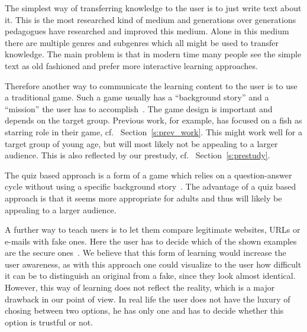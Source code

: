 \begin{description}[leftmargin=0cm]
    \item[Simple Text] The simplest way of transferring knowledge to the user is to just write text about it.
    This is the most researched kind of medium and generations over generations pedagogues have researched and improved this medium.
    Alone in this medium there are multiple genres and subgenres which all might be used to transfer knowledge.
    The main problem is that in modern time many people see the simple text as old fashioned and prefer more interactive learning approaches. 
    
	\item[Game Based Learning] Therefore another way to communicate the learning content to the user is to use a traditional game.
 Such a game usually has a ``background story'' and a ``mission'' the user has to accomplish~\cite{sheng2007antiphishingphil,antiphishingphyllis}. The game design is important and depends on the target group.
 Previous work, for example, has focused on a fish as starring role in their game, cf.
~Section~\ref{s:prev_work}. This might work well for a target group of young age, but will most likely not be appealing to a larger audience.
 This is also reflected by our prestudy, cf.
~Section~\ref{s:prestudy}.
	\item[Quiz Based Learning] The quiz based approach is a form of a game which relies on a question-answer cycle without using a specific background story~\cite{onguardonline}. The advantage of a quiz based approach is that it seems more appropriate for adults and thus will likely be appealing to a larger audience.

	\item[Comparison Based Learning] A further way to teach users is to let them compare legitimate websites, URLs or e-mails with fake ones.
 Here the user has to decide which of the shown examples are the secure ones~\cite{staysafeonline}. We believe that this form of learning would increase the user awareness, as with this approach one could visualize to the user how difficult it can be to distinguish an original from a fake, since they look almost identical.
 However, this way of learning does not reflect the reality, which is a major drawback in our point of view.
 In real life the user does not have the luxury of chosing between two options, he has only one and has to decide whether this option is trustful or not.


\end{description}
